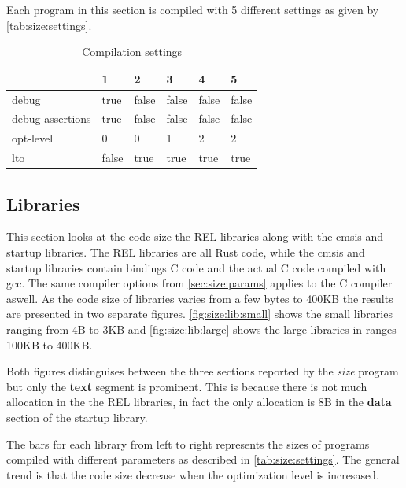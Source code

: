 Each program in this section is compiled with 5 different settings as given by \autoref{tab:size:settings}.
\begin{table}[H]
  \centering
  \begin{tabular}{|l|l|l|l|l|l|}
    \hline
    & 1     & 2     & 3     & 4     & 5     \\
    \hline
    debug            & true  & false & false & false & false \\
    debug-assertions & true  & false & false & false & false \\
    opt-level        & 0     & 0     & 1     & 2     & 2     \\
    lto              & false & true  & true  & true  & true  \\
    \hline
  \end{tabular}
  \caption{Compilation settings}
  \label{tab:size:settings}
\end{table}

\subsection{Libraries}

This section looks at the code size the REL libraries along with the cmsis and startup libraries.
The REL libraries are all Rust code, while the cmsis and startup libraries contain bindings C code and the actual C code compiled with gcc.
The same compiler options from \autoref{sec:size:params} applies to the C compiler aswell.
As the code size of libraries varies from a few bytes to 400KB the results are presented in two separate figures.
\autoref{fig:size:lib:small} shows the small libraries ranging from 4B to 3KB and \autoref{fig:size:lib:large} shows the large libraries in ranges 100KB to 400KB.

Both figures distinguises between the three sections reported by the \emph{size} program but only the \textbf{text} segment is prominent.
This is because there is not much allocation in the the REL libraries, in fact the only allocation is 8B in the \textbf{data} section of the startup library.

The bars for each library from left to right represents the sizes of programs compiled with different parameters as described in \autoref{tab:size:settings}.
The general trend is that the code size decrease when the optimization level is incresased.

